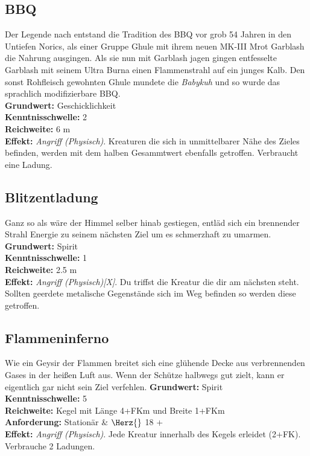 \subsection*{BBQ} \label{sk:bbq}
Der Legende nach entstand die Tradition des BBQ vor grob 54 Jahren in den Untiefen Norics, als einer Gruppe Ghule mit ihrem neuen MK-III Mrot Garblash die Nahrung ausgingen. Als sie nun mit Garblash jagen gingen entfesselte Garblash mit seinem Ultra Burna einen Flammenstrahl auf ein junges Kalb. Den sonst Rohfleisch gewohnten Ghule mundete die \textit{Babykuh} und so wurde das sprachlich modifizierbare BBQ. \\
\textbf{Grundwert:} Geschicklichkeit \\
\textbf{Kenntnisschwelle:} 2 \\
\textbf{Reichweite:} 6 m \\
\textbf{Effekt:} \textit{Angriff (Physisch)}. Kreaturen die sich in unmittelbarer Nähe des Zieles befinden, werden mit dem halben Gesammtwert ebenfalls getroffen. Verbraucht eine Ladung.

\subsection*{Blitzentladung} \label{sk:blitzentladung}
Ganz so als wäre der Himmel selber hinab gestiegen, entläd sich ein brennender Strahl Energie zu seinem nächsten Ziel um es schmerzhaft zu umarmen.\\
\textbf{Grundwert:} Spirit \\
\textbf{Kenntnisschwelle:} 1 \\
\textbf{Reichweite:} 2.5 m \\
\textbf{Effekt:} \textit{Angriff (Physisch)[X]}. Du triffst die Kreatur die dir am nächsten steht. Sollten geerdete metalische Gegenstände sich im Weg befinden so werden diese getroffen.

\subsection*{Flammeninferno} \label{sk:flammeninferno}
Wie ein Geysir der Flammen breitet sich eine glühende Decke aus verbrennenden Gases in der heißen Luft aus. Wenn der Schütze halbwegs gut zielt, kann er eigentlich gar nicht sein Ziel verfehlen.
\textbf{Grundwert:} Spirit \\
\textbf{Kenntnisschwelle:} 5 \\
\textbf{Reichweite:} Kegel mit Länge 4+FKm und Breite 1+FKm \\
\textbf{Anforderung:} Stationär \& $\Herz{}$ 18 +\\
\textbf{Effekt:} \textit{Angriff (Physisch)}. Jede Kreatur innerhalb des Kegels erleidet \textit{} (2+FK). Verbrauche 2 Ladungen.

